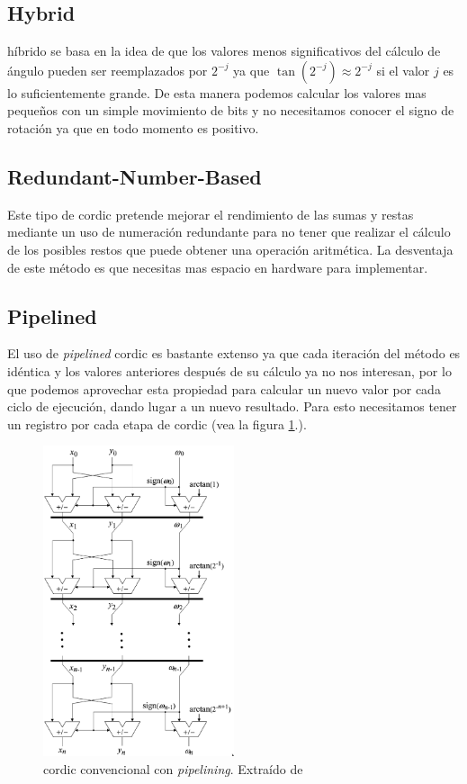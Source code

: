 \subsection{Hybrid }
 híbrido se basa en la idea de que los valores menos significativos del cálculo de ángulo pueden ser reemplazados por $2^{-j}$ ya que $\tan(2^{-j}) \approx 2^{-j} $ si el valor $j$ es lo suficientemente grande. De esta manera podemos calcular los valores mas pequeños con un simple movimiento de bits y no necesitamos conocer el signo de rotación ya que en todo momento es positivo. \cite{wang_hybrid_1997}

\subsection{Redundant-Number-Based }
Este tipo de \gls{cordic} pretende mejorar el rendimiento de las sumas y restas mediante un uso de numeración redundante para no tener que realizar el cálculo de los posibles restos que puede obtener una operación aritmética. La desventaja de este método es que necesitas mas espacio en hardware para implementar. \cite{ercegovac_redundant_1990}

\subsection{Pipelined }
El uso de \textit{pipelined} \gls{cordic} es bastante extenso ya que cada iteración del método es idéntica y los valores anteriores después de su cálculo ya no nos interesan, por lo que podemos aprovechar esta propiedad para calcular un nuevo valor por cada ciclo de ejecución, dando lugar a un nuevo resultado. Para esto necesitamos tener un registro por cada etapa de \gls{cordic} (vea la figura \ref{graf:2009-CORDIC_pipelined}.).

\begin{figure}[ht]
	\centering
	\includegraphics[width=0.50\textwidth]{archivos/CORDIC/2009-CORDIC_pipelined.png}
	\caption{\gls{cordic} convencional con \textit{pipelining}. Extraído de \cite{meher_50_2009}}
	\label{graf:2009-CORDIC_pipelined}
\end{figure}

